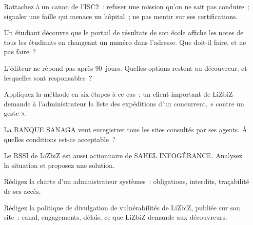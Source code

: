 \begin{boxexo}[title={\ding{45}\quad Exercice~12.2. Les canons \niveaubase}]
Rattachez à un canon de l'ISC2~: refuser une mission qu'on ne sait pas
conduire~; signaler une faille qui menace un hôpital~; ne pas mentir sur
ses certifications.
\end{boxexo}

\begin{boxexo}[title={\ding{45}\quad Exercice~12.3. La découverte \niveaumoyen}]
Un étudiant découvre que le portail de résultats de son école affiche les
notes de tous les étudiants en changeant un numéro dans l'adresse. Que
doit-il faire, et ne pas faire~?
\end{boxexo}

\begin{boxexo}[title={\ding{45}\quad Exercice~12.4. Le délai \niveaumoyen}]
L'éditeur ne répond pas après 90~jours. Quelles options restent au
découvreur, et lesquelles sont responsables~?
\end{boxexo}

\begin{boxexo}[title={\ding{45}\quad Exercice~12.5. La méthode \niveaumoyen}]
Appliquez la méthode en six étapes à ce cas~: un client important de
LiZbiZ demande à l'administrateur la liste des expéditions d'un
concurrent, « contre un geste ».
\end{boxexo}

\begin{boxexo}[title={\ding{45}\quad Exercice~12.6. Surveiller les salariés \niveaumoyen}]
La BANQUE SANAGA veut enregistrer tous les sites consultés par ses
agents. À quelles conditions est-ce acceptable~?
\end{boxexo}

\begin{boxexo}[title={\ding{45}\quad Exercice~12.7. Le conflit d'intérêts \niveaumoyen}]
Le RSSI de LiZbiZ est aussi actionnaire de SAHEL INFOGÉRANCE. Analysez la
situation et proposez une solution.
\end{boxexo}

\begin{boxexo}[title={\ding{45}\quad Exercice~12.8. La charte \niveaumoyen}]
Rédigez la charte d'un administrateur systèmes~: obligations, interdits,
traçabilité de ses accès.
\end{boxexo}

\begin{boxexo}[title={\ding{45}\quad Exercice~12.9. Une politique de divulgation \niveauexpert}]
Rédigez la politique de divulgation de vulnérabilités de LiZbiZ, publiée
sur son site~: canal, engagements, délais, ce que LiZbiZ demande aux
découvreurs.
\end{boxexo}

